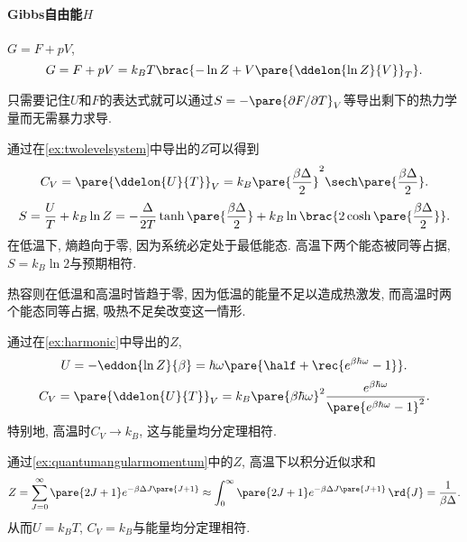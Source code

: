 \documentclass[../Thermal.tex]{subfiles}
\begin{document}
\paragraph{Gibbs自由能$H$} $G = F + pV$,
\[ G = F + pV = k_B T\brac{-\ln Z + V\pare{\ddelon{\ln Z}{V}}_T}. \]
\begin{remark}
只需要记住$U$和$F$的表达式就可以通过$S = -\pare{\partial F/\partial T}_V$等导出剩下的热力学量而无需暴力求导.
\end{remark}
\begin{ex}[二能级系统]
通过在\cref{ex:twolevelsystem}中导出的$Z$可以得到
\[ C_V = \pare{\ddelon{U}{T}}_V = k_B\pare{\frac{\beta \Delta}{2}}^2\sech\pare{\frac{\beta\Delta}{2}}. \]
\[ S = \frac{U}{T} + k_B\ln Z = -\frac{\Delta}{2T}\tanh\pare{\frac{\beta \Delta}{2}} + k_B \ln \brac{2\cosh\pare{\frac{\beta \Delta}{2}}}. \]
在低温下, 熵趋向于零, 因为系统必定处于最低能态. 高温下两个能态被同等占据, $S=k_B\ln 2$与预期相符. 
\par
热容则在低温和高温时皆趋于零, 因为低温的能量不足以造成热激发, 而高温时两个能态同等占据, 吸热不足矣改变这一情形.
\end{ex}
\begin{ex}[谐振子]
通过在\cref{ex:harmonic}中导出的$Z$,
\begin{equation}
\label{eq:uofharmonic}
U = -\eddon{\ln Z}{\beta} = \hbar\omega\pare{\half + \rec{e^{\beta\hbar\omega} - 1}}.
\end{equation}
\[ C_V = \pare{\ddelon{U}{T}}_V = k_B\pare{\beta\hbar\omega}^2\frac{e^{\beta\hbar\omega}}{\pare{e^{\beta\hbar\omega}-1}^2}. \]
特别地, 高温时$C_V\rightarrow k_B$, 这与能量均分定理相符.
\end{ex}
\begin{ex}[转动双原子分子]
通过\cref{ex:quantumangularmomentum}中的$Z$, 高温下以积分近似求和
\[ Z = \sum_{J=0}^\infty \pare{2J+1}e^{-\beta\Delta J\pare{J+1}} \approx \int_0^\infty \pare{2J+1}e^{-\beta\Delta J\pare{J+1}}\,\rd{J} = \frac{1}{\beta \Delta}. \]
从而$U=k_BT$, $C_V=k_B$与能量均分定理相符.
\end{ex}
\end{document}
